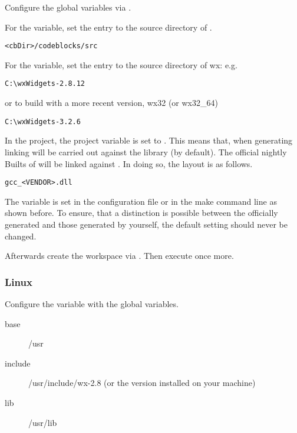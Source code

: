 Configure the global variables via .


For the  variable, set the  entry to the source directory of \codeblocks.

\begin{verbatim}
<cbDir>/codeblocks/src
\end{verbatim}


For the  variable, set the  entry to the source directory of wx: e.g.

\begin{verbatim}
C:\wxWidgets-2.8.12
\end{verbatim}

or to build with a more recent version, wx32 (or wx32\_64)

\begin{verbatim}
C:\wxWidgets-3.2.6
\end{verbatim}

In the \codeblocks project, the project variable  is set to . This means that, when generating \codeblocks linking will be carried out against the  library (by default). The official nightly Builts of \codeblocks will be linked against . In doing so, the layout is as follows.

\begin{verbatim}
gcc_<VENDOR>.dll
\end{verbatim}

The  variable is set in the configuration file  or in the make command line as shown before. To ensure, that a distinction is possible between the officially generated \codeblocks and those generated by yourself, the default setting  should never be changed.

Afterwards create the workspace  via . Then execute  once more.

\subsubsection{Linux}

Configure the  variable with the global variables.

\begin{description}
\item[base] /usr
\item[include] /usr/include/wx-2.8 (or the version installed on your machine)
\item[lib] /usr/lib
\end{description}



